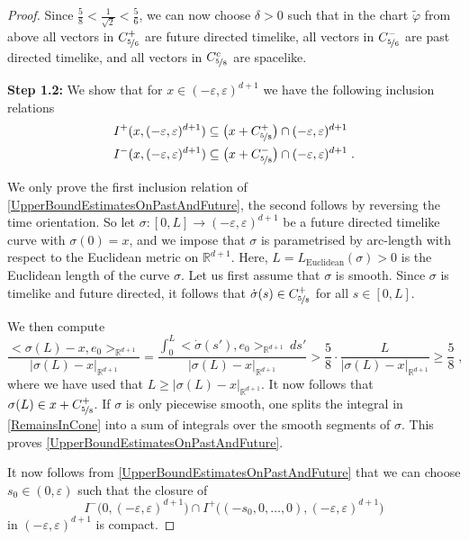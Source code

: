 \documentclass[reqno]{article}
\newcommand{\R}{\mathbb{R}}
\newcommand{\ed}{(-\varepsilon, \varepsilon)^{d+1}}
\begin{document}
\begin{proof}
Since $\frac{5}{8} < \frac{1}{\sqrt{2}} < \frac{5}{6}$, we can now choose $\delta >0$ such that in the chart $\tilde{\varphi}$ from above all vectors in $C^+_{\nicefrac{5}{6}}$ are future directed timelike, all vectors in $C^-_{\nicefrac{5}{6}}$ are past directed timelike, and all vectors in $C^c_{\nicefrac{5}{8}}$ are spacelike.
\vspace*{2mm}

\textbf{Step 1.2:} We show that for $x \in \ed$ we have the following inclusion relations
\begin{equation}
\label{UpperBoundEstimatesOnPastAndFuture}
\begin{split}
& I^+(x, (-\varepsilon, \varepsilon)^{d+1}) \subseteq \big( x + C^+_{\nicefrac{5}{8}}\big) \cap  \ed \\
& I^-(x, (-\varepsilon, \varepsilon)^{d+1}) \subseteq \big( x + C^-_{\nicefrac{5}{8}}\big) \cap  \ed  \;.
\end{split}
\end{equation}
\vspace*{2mm}

We only prove the first inclusion relation of \eqref{UpperBoundEstimatesOnPastAndFuture}, the second follows by reversing the time orientation. So let $\sigma : [0,L] \to \ed$ be a future directed timelike curve with $\sigma(0) = x$, and we impose that $\sigma$ is parametrised by arc-length with respect to the Euclidean metric on $\R^{d+1}$. Here, $L = L_{\mathrm{Euclidean}}(\sigma) >0$ is the Euclidean length of the curve $\sigma$. Let us first assume that $\sigma$ is smooth. Since $\sigma$ is timelike and future directed, it follows that $\dot{\sigma}(s) \in  C^+_{\nicefrac{5}{8}}$ for all $s \in [0,L]$.


We then compute 
\begin{equation}
\label{RemainsInCone}
\frac{<\sigma(L) - x, e_0>_{\R^{d+1}}}{|\sigma(L) - x|_{\R^{d+1}}} = \frac{\int_0^L<\dot{\sigma}(s'), e_0>_{\R^{d+1}}\,ds'}{|\sigma(L) - x|_{\R^{d+1}}} > \frac{5}{8} \cdot \frac{L}{|\sigma(L) - x|_{\R^{d+1}}} \geq \frac{5}{8} \;,
\end{equation}
where we have used that $L \geq |\sigma(L) - x|_{\R^{d+1}}$. It now follows that $\sigma(L)  \in  x + C^+_{\nicefrac{5}{8}}$. If $\sigma$ is only piecewise smooth, one splits the integral in \eqref{RemainsInCone} into a sum of integrals over the smooth segments of $\sigma$. This proves \eqref{UpperBoundEstimatesOnPastAndFuture}.
\vspace*{2mm}

It now follows from \eqref{UpperBoundEstimatesOnPastAndFuture} that we can choose $s_0 \in (0, \varepsilon)$ such that the closure of 
\begin{equation*}
I^-\big(0, \ed\big) \cap I^+\big((-s_0, 0, \ldots, 0), \ed\big)
\end{equation*}
in $\ed$ is compact.
\vspace*{2mm}


\end{proof}
\end{document}
